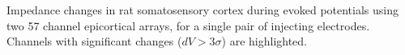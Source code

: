 \label{EPDZ} Impedance changes in rat somatosensory cortex during evoked potentials using two 57 channel epicortical arrays, for a single pair of injecting electrodes.  Channels with significant changes ($dV > 3\sigma$) are highlighted.